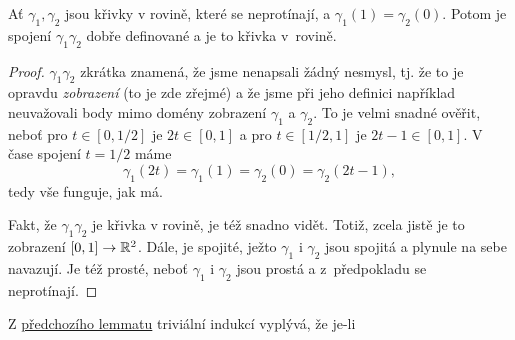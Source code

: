 \begin{lemma}
 \label{lem:spojeni-krivek}
 Ať $\gamma_1,\gamma_2$ jsou křivky v rovině, které se neprotínají, a
 $\gamma_1(1) = \gamma_2(0)$. Potom je spojení $\gamma_1\gamma_2$ dobře
 definované a je to křivka v~rovině.
\end{lemma}
\begin{proof}
  $\gamma_1\gamma_2$ zkrátka znamená, že jsme nenapsali
 žádný nesmysl, tj. že to je opravdu \emph{zobrazení} (to je zde zřejmé) a že
 jsme při jeho definici například neuvažovali body mimo domény zobrazení
 $\gamma_1$ a $\gamma_2$. To je velmi snadné ověřit, neboť pro $t \in [0,1 / 2]$
 je $2t \in [0,1]$ a pro $t \in [1 / 2,1]$ je $2t-1 \in [0,1]$. V čase spojení
 $t = 1 / 2$ máme
 \[
  \gamma_1(2t) = \gamma_1(1) = \gamma_2(0) = \gamma_2(2t - 1),
 \]
 tedy vše funguje, jak má.

 Fakt, že $\gamma_1\gamma_2$ je křivka v rovině, je též snadno vidět. Totiž,
 zcela jistě je to zobrazení $[0,1] \to \mathbb{R}^2$. Dále, je spojité, ježto
 $\gamma_1$ i $\gamma_2$ jsou spojitá a plynule na sebe navazují. Je též prosté,
 neboť $\gamma_1$ i $\gamma_2$ jsou prostá a z~předpokladu se neprotínají.
\end{proof}

Z \hyperref[lem:spojeni-krivek]{předchozího lemmatu} triviální indukcí vyplývá,
že je-li 
